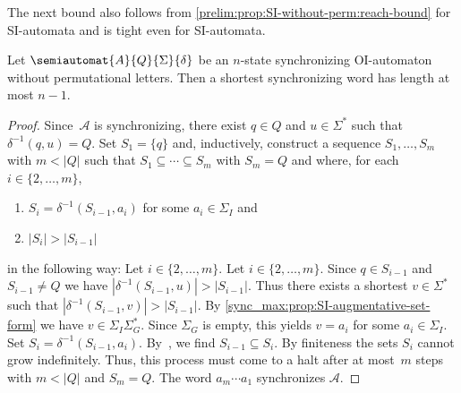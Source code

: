 The next bound also follows from \cref{prelim:prop:SI-without-perm:reach-bound} for SI-automata
and is tight even for SI-automata.

\begin{corollary} \label{syncmax:graph:cor:OI-sync}
	Let $\semiautomat{A}{Q}{\Sigma}{\delta}$ be an $n$-state synchronizing OI-automaton without permutational letters.
	Then a shortest synchronizing word has length at most $n - 1$.
\end{corollary}
\begin{proof}
	Since~$\mathcal A$ is synchronizing, there exist $q \in Q$ and $u \in \Sigma^*$
	such that $\delta^{-1}(q, u) = Q$.
	Set $S_1 = \{q\}$ and, inductively, construct a sequence $S_1, \ldots, S_m$ with $m < |Q|$
	such that $S_1 \subseteq \cdots \subseteq S_m$ with $S_m = Q$
	and where, for each  $i \in \{2,\ldots,m\}$, 
	\begin{enumerate}
		\item $S_{i} = \delta^{-1}(S_{i-1}, a_i)$ for some $a_i \in \Sigma_I$ and
			
		\item $|S_i| > |S_{i-1}|$	
	\end{enumerate}
	in the following way: Let $i \in \{2,\ldots,m\}$. Let $i \in \{2,\ldots,m\}$. Since $q \in S_{i-1}$
	and $S_{i-1} \ne Q$ we have $|\delta^{-1}(S_{i-1}, u)| > |S_{i-1}|$.
	Thus there exists a shortest $v \in \Sigma^*$
	such that $|\delta^{-1}(S_{i-1}, v)| > |S_{i-1}|$.
	By \cref{sync_max:prop:SI-augmentative-set-form} 
	we have $v \in \Sigma_I \Sigma_G^*$.
	Since $\Sigma_G$ is empty, this yields $v = a_i$
	for some $a_i \in \Sigma_I$.
	Set $S_i = \delta^{-1}(S_{i-1}, a_i)$.
	By~,
	we find $S_{i-1} \subseteq S_i$.
	By finiteness the sets $S_i$ cannot grow indefinitely. Thus, 
	this process must come to a halt after at most~$m$ steps with $m < |Q|$
	and $S_m = Q$.
	The word $a_m \cdots a_1$ synchronizes $\mathcal A$.
\end{proof}

